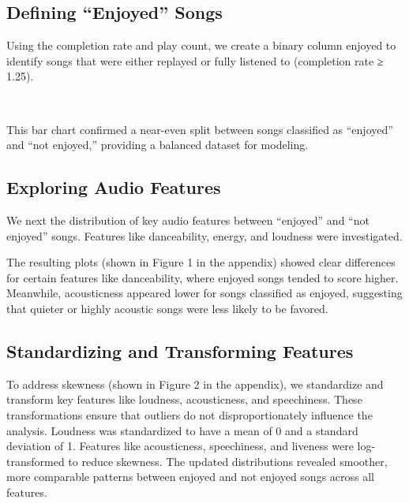 \documentclass[11pt]{article}
\begin{document}
\subsection{Defining ``Enjoyed'' Songs}\label{defining-enjoyed-songs}

Using the completion rate and play count, we create a binary column
enjoyed to identify songs that were either replayed or fully listened to
(completion rate ≥ 1.25).

    \begin{center}
    \end{center}
    { \hspace*{\fill} \\}
    
    This bar chart confirmed a near-even split between songs classified as
``enjoyed'' and ``not enjoyed,'' providing a balanced dataset for
modeling.

\subsection{Exploring Audio Features}\label{exploring-audio-features}

We next the distribution of key audio features between ``enjoyed'' and
``not enjoyed'' songs. Features like danceability, energy, and loudness
were investigated.

The resulting plots (shown in Figure 1 in the appendix) showed clear
differences for certain features like danceability, where enjoyed songs
tended to score higher. Meanwhile, acousticness appeared lower for songs
classified as enjoyed, suggesting that quieter or highly acoustic songs
were less likely to be favored.

\subsection{Standardizing and Transforming
Features}\label{standardizing-and-transforming-features}

To address skewness (shown in Figure 2 in the appendix), we standardize
and transform key features like loudness, acousticness, and speechiness.
These transformations ensure that outliers do not disproportionately
influence the analysis. Loudness was standardized to have a mean of 0
and a standard deviation of 1. Features like acousticness, speechiness,
and liveness were log-transformed to reduce skewness. The updated
distributions revealed smoother, more comparable patterns between
enjoyed and not enjoyed songs across all features.
\end{document}
